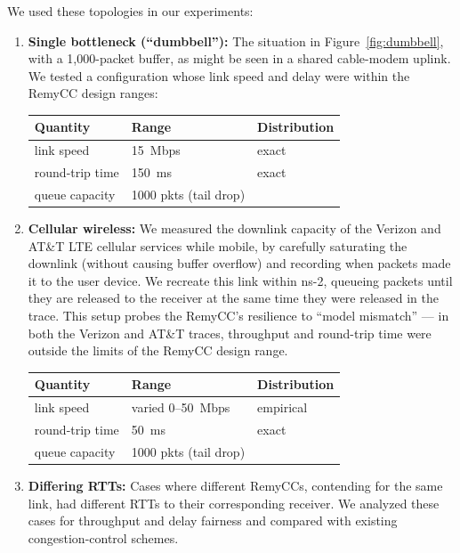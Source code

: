 \medskip
{} We used these topologies in our experiments:
\begin{enumerate}
\item {\bf Single bottleneck (``dumbbell''):} The situation in
  Figure~\ref{fig:dumbbell}, with a 1,000-packet buffer, as might be
  seen in a shared cable-modem uplink. We tested a configuration whose
  link speed and delay were within the RemyCC design ranges:


\begin{tabular}{lll}
\bf Quantity & \bf Range & \bf Distribution \\
\hline link speed & 15~Mbps & exact \\
round-trip time & 150~ms & exact \\
queue capacity & 1000 pkts (tail drop) \\
\end{tabular}

\item {\bf Cellular wireless:} We measured the downlink capacity of the
  Verizon and AT\&T LTE cellular services while mobile, by carefully
  saturating the downlink (without causing buffer overflow) and
  recording when packets made it to the user device. We recreate this
  link within ns-2, queueing packets until they are released to the
  receiver at the same time they were released in the trace. This
  setup probes the RemyCC's resilience to ``model mismatch'' --- in
  both the Verizon and AT\&T traces, throughput and round-trip time
  were outside the limits of the RemyCC design range.
  

\begin{tabular}{lll}
\bf Quantity & \bf Range & \bf Distribution \\
\hline link speed & varied 0--50~Mbps & empirical \\
round-trip time & 50~ms & exact \\
queue capacity & 1000 pkts (tail drop) \\
\end{tabular}

\item {\bf Differing RTTs:} Cases where different RemyCCs, contending for
  the same link, had different RTTs to their corresponding
  receiver. We analyzed these cases for throughput and delay fairness
  and compared with existing congestion-control schemes.


\end{enumerate}
